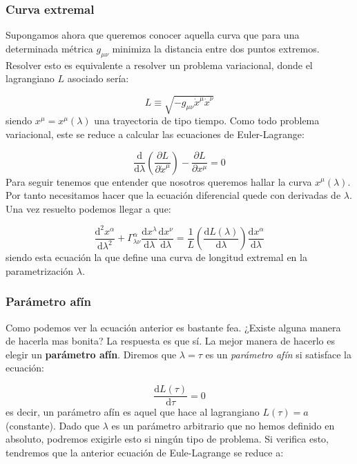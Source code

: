 \documentclass[12pt,a4paper]{book}
\numberwithin{equation}{section}
\numberwithin{figure}{section}
\newcommand{\parentesis}[1]{\left( #1  \right)}
\newcommand{\parciales}[2]{\frac{\partial #1}{\partial #2}}
\newcommand{\D}{\mathrm{d}}
\newcommand{\derivadas}[2]{\frac{\D #1}{\D #2}}
\begin{document}
\subsubsection{Curva extremal}

Supongamos ahora que queremos conocer aquella curva que para una determinada métrica $g_{\mu \nu}$ minimiza la distancia entre dos puntos extremos. Resolver esto es equivalente a resolver un problema variacional, donde el lagrangiano $L$ asociado sería:

\begin{equation}
L \equiv \sqrt{-g_{\mu \nu} \dot{x}^\mu \dot{x}^\nu}
\end{equation}
siendo $x^\mu = x^\mu (\lambda)$ una trayectoria de tipo tiempo. Como todo problema variacional, este se reduce a calcular las ecuaciones de Euler-Lagrange: 

\begin{equation}
\dfrac{\D }{\D \lambda} \parentesis{\parciales{L}{\dot{x}^\mu}} - \parciales{L}{x^\mu} = 0
\end{equation}
Para seguir tenemos que entender que nosotros queremos hallar la curva $x^\mu(\lambda)$. Por tanto necesitamos hacer que la ecuación diferencial quede con derivadas de $\lambda$. Una vez resuelto podemos llegar a que:

\begin{equation}
\derivadas{^2 x^\alpha}{\lambda^2} + \Gamma^\alpha_{\lambda \nu} \derivadas{x^\lambda}{\lambda} \derivadas{x^\nu}{\lambda} = \dfrac{1}{L} \parentesis{\derivadas{L (\lambda)}{\lambda}} \derivadas{x^\alpha}{\lambda} 
\end{equation} 
siendo esta ecuación la que define una curva de longitud extremal en la parametrización $\lambda$.

\subsubsection{Parámetro afín}

Como podemos ver la ecuación anterior es bastante fea. ¿Existe alguna manera de hacerla mas bonita? La respuesta es que sí. La mejor manera de hacerlo es elegir un \textbf{parámetro afín}. Diremos que $\lambda = \tau$ es un \textit{parámetro afín} si satisface la ecuación:

\begin{equation}
\derivadas{L(\tau)}{\tau} = 0
\end{equation}
es decir, un parámetro afín es aquel que hace al lagrangiano $L(\tau)=a$ (constante). Dado que $\lambda$ es un parámetro arbitrario que no hemos definido en absoluto, podremos exigirle esto si ningún tipo de problema. Si verifica esto, tendremos que la anterior ecuación de Eule-Lagrange se reduce a:
\end{document}
